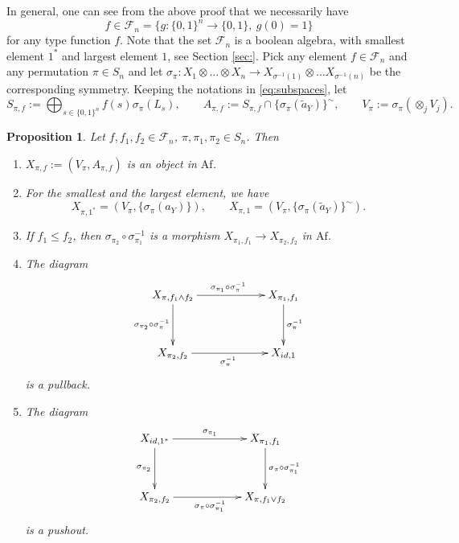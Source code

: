\documentclass[12pt]{article}
\newtheorem{prop}{Proposition}
\theoremstyle{definition}
\theoremstyle{remark}
\def\Fe{\mathcal F}
\def \Af{\mathrm{Af}}
\begin{document}
In general, one can see from the above proof that we
necessarily have 
\[
f\in \Fe_n=\{g:\{0,1\}^n\to \{0,1\},\ g(0)=1\}
\]
for any type function $f$. Note that the set $\Fe_n$ is a boolean algebra, with smallest
element $1^*$ and largest element $1$, see Section
\ref{sec:}. Pick any element $f\in \Fe_n$ and any permutation $\pi\in S_n$ and let
$\sigma_\pi: X_1\otimes\dots\otimes  X_n\to X_{\sigma^{-1}(1)}\otimes \dots X_{\sigma^{-1}(n)}$ be the
corresponding symmetry. Keeping the notations in \eqref{eq:subspaces},  let 
\[
S_{\pi,f}:=\bigoplus_{s\in \{0,1\}^n} f(s)\sigma_\pi(L_s),\qquad
A_{\pi,f}:=S_{\pi,f}\cap\{\sigma_\pi(\tilde a_Y)\}^\sim,\qquad
V_\pi:=\sigma_\pi(\otimes_{j}V_{j}).
\]

\begin{prop}\label{prop:xpif} Let $f,f_1,f_2\in \Fe_n$, $\pi,\pi_1,\pi_2
\in S_n$. Then 
\begin{enumerate}
\item[(i)]  $X_{\pi,f}:=(V_\pi, A_{\pi,f})$ is an
object in $\Af$.
\item[(ii)] For the smallest and the largest element, we have  
\[
X_{\pi,1^*}=(V_\pi, \{\sigma_\pi(a_Y)\}),\qquad X_{\pi,1}=(V_\pi,\{\sigma_\pi(\tilde
a_Y)\}^\sim).
\]
\item[(iii)] If $f_1\le f_2$, then 
$\sigma_{\pi_2}\circ\sigma_{\pi_1}^{-1}$ is a morphism $X_{\pi_1,f_1}\to X_{\pi_2,f_2}$ in
$\Af$.
\item[(iv)] The diagram
\[
\xymatrixcolsep{5pc}\xymatrixrowsep{3pc}\xymatrix{
X_{\pi,f_1\wedge
f_2}\ar[r]^{\sigma_{\pi_1}\circ\sigma^{-1}_\pi}
\ar[d]_{\sigma_{\pi_2}\circ\sigma^{-1}_\pi} & X_{\pi_1,f_1}\ar[d]^{\sigma_\pi^{-1}} \\
X_{\pi_2,f_2} \ar[r]_{\sigma_\pi^{-1}}& X_{id,1} 
}
\]
is a pullback.
\item[(v)] The diagram
\[
\xymatrixcolsep{5pc}\xymatrixrowsep{3pc}\xymatrix{
X_{id,1^*}\ar[r]^{\sigma_{\pi_1}}
\ar[d]_{\sigma_{\pi_2}} & X_{\pi_1,f_1}\ar[d]^{\sigma_\pi\circ\sigma_{\pi_1}^{-1}} \\
X_{\pi_2,f_2} \ar[r]_{\sigma_\pi\circ\sigma_{\pi_1}^{-1}}& X_{\pi, f_1\vee f_2} 
}
\]
is a pushout.
\end{enumerate}


\end{prop}
\end{document}
